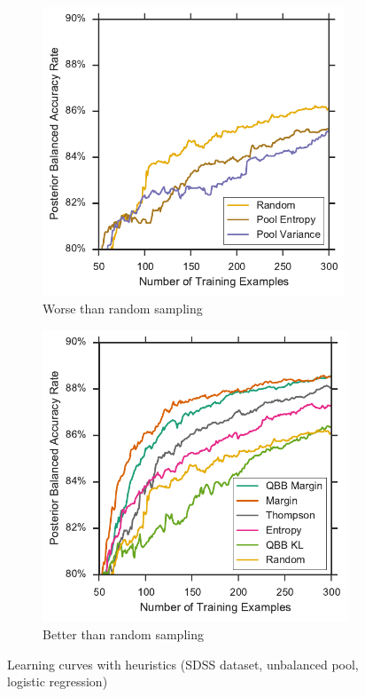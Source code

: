 \begin{figure}[p]
	\centering
	\begin{subfigure}{.5\textwidth}
		\centering
		\includegraphics[width=0.99\textwidth]{figures/5_active/sdss_ur_ind_lower}
		\caption{Worse than random sampling}
		\label{fig:sdss_ur_ind_lower}
	\end{subfigure}%
	\begin{subfigure}{.5\textwidth}
		\centering
		\includegraphics[width=0.99\linewidth]{figures/5_active/sdss_ur_ind_upper}
		\caption{Better than random sampling}
		\label{fig:sdss_ur_ind_upper}
	\end{subfigure}
	\caption[Learning curves with heuristics (SDSS, unbalanced, logistic)]{
		Learning curves with heuristics (SDSS dataset, unbalanced pool, logistic regression)}
	\label{fig:sdss_ur_ind}
\end{figure}

